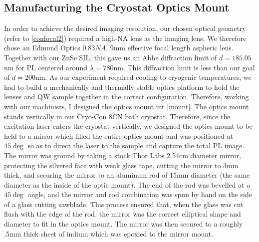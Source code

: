 \subsection{Manufacturing the Cryostat Optics Mount}
\indent In order to achieve the desired imaging resolution, our chosen optical geometry (refer to \ref{confocal2}) required a high-NA lens as the imaging lens. We therefore chose an Edmund Optics $0.83NA$, 9mm effective focal length aspheric lens. Together with our ZnSe SIL, this gave us an Abbe diffraction limit of $d = 185.05$nm for PL centered around $\lambda = 780$nm. This diffraction limit is less than our goal of $d = 200$nm. As our experiment required cooling to cryogenic temperatures, we had to build a mechanically and thermally stable optics platform to hold the lenses and QW sample together in the correct configuration. Therefore, working with our machinists, I designed the optics mount int \ref{mount}. The optics mount stands vertically in our Cryo-Con 8CN bath cryostat. Therefore, since the excitation laser enters the cryostat vertically, we designed the optics mount to be held to a mirror which filled the entire optics mount and was positioned at $45\deg$ so as to direct the laser to the sample and capture the total PL image. The mirror was ground by taking a stock Thor Labs 2.54cm diameter mirror, protecting the silvered face with weak glass tape, cutting the mirror to 3mm thick, and securing the mirror to an aluminum rod of 15mm diameter (the same diameter as the inside of the optic mount). The end of the rod was bevelled at a $45\deg$ angle, and the mirror and rod combination was spun by hand on the side of a glass cutting sawblade. This process ensured that, when the glass was cut flush with the edge of the rod, the mirror was the correct elliptical shape and diameter to fit in the optics mount. The mirror was then secured to a roughly .5mm thick sheet of indium which was epoxied to the mirror mount. 


